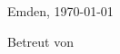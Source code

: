 \begin{titlepage}
\begin{center}
		\vspace{1cm}
		Emden, \today %

		\vspace{1cm}%
		Betreut von\\ \ \\ %
		\betreuerEins\\ %
		\betreuerZwei\\ %
		\betreuerDrei\\ %
		\betreuerVier

	\end{center}
	\normalsize
\end{titlepage}